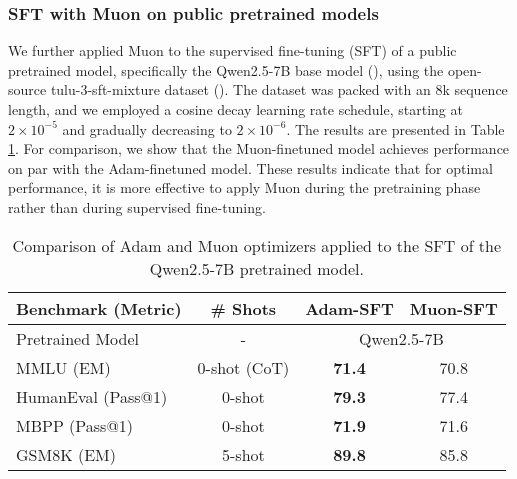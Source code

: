 \subsubsection{SFT with Muon on public pretrained models}

We further applied Muon to the supervised fine-tuning (SFT) of a public pretrained model, specifically the Qwen2.5-7B base model (\cite{qwen2.5}), using the open-source tulu-3-sft-mixture dataset (\cite{lambert2024tulu3}). The dataset was packed with an 8k sequence length, and we employed a cosine decay learning rate schedule, starting at $2 \times 10^{-5}$ and gradually decreasing to $2 \times 10^{-6}$. The results are presented in Table \ref{tab:public-model-SFT-results}. For comparison, we show that the Muon-finetuned model achieves performance on par with the Adam-finetuned model. These results indicate that for optimal performance, it is more effective to apply Muon during the pretraining phase rather than during supervised fine-tuning.

\begin{table}[ht]
\small
\centering
\caption{Comparison of Adam and Muon optimizers applied to the SFT of the Qwen2.5-7B pretrained model.}
\label{tab:public-model-SFT-results}
\begin{tabular}{l c|c|c}
\toprule
\textbf{Benchmark (Metric)} & \textbf{\# Shots} & \textbf{Adam-SFT} & \textbf{Muon-SFT} \\
\midrule
Pretrained Model & - & \multicolumn{2}{|c}{Qwen2.5-7B} \\
\midrule
MMLU (EM) & 0-shot (CoT) & \textbf{71.4} & 70.8 \\
HumanEval (Pass@1) & 0-shot & \textbf{79.3} & 77.4 \\
MBPP (Pass@1) & 0-shot & \textbf{71.9} & 71.6 \\
GSM8K (EM) & 5-shot & \textbf{89.8} & 85.8 \\
\bottomrule
\end{tabular}
\end{table}





